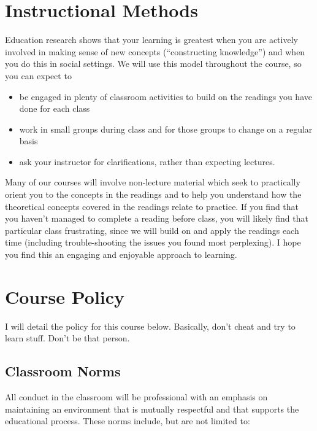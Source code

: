 \documentclass[11pt,]{article}
\providecommand{\tightlist}{%
  \setlength{\itemsep}{0pt}\setlength{\parskip}{0pt}}
\begin{document}
\section{Instructional Methods}\label{instructional-methods}

Education research shows that your learning is greatest when you are
actively involved in making sense of new concepts (``constructing
knowledge'') and when you do this in social settings. We will use this
model throughout the course, so you can expect to

\begin{itemize}
\tightlist
\item
  be engaged in plenty of classroom activities to build on the readings
  you have done for each class
\item
  work in small groups during class and for those groups to change on a
  regular basis
\item
  ask your instructor for clarifications, rather than expecting
  lectures.
\end{itemize}

Many of our courses will involve non-lecture material which seek to
practically orient you to the concepts in the readings and to help you
understand how the theoretical concepts covered in the readings relate
to practice. If you find that you haven't managed to complete a reading
before class, you will likely find that particular class frustrating,
since we will build on and apply the readings each time (including
trouble-shooting the issues you found most perplexing). I hope you find
this an engaging and enjoyable approach to learning.

\section{Course Policy}\label{course-policy}

I will detail the policy for this course below. Basically, don't cheat
and try to learn stuff. Don't be that person.

\subsection{Classroom Norms}\label{classroom-norms}

All conduct in the classroom will be professional with an emphasis on
maintaining an environment that is mutually respectful and that supports
the educational process. These norms include, but are not limited to:
\end{document}
